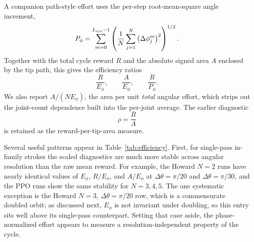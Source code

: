 \documentclass[11pt]{article}
\begin{document}
A companion path-style effort uses the per-step root-mean-square angle increment,
\begin{equation}
P_\phi
= \sum_{m=0}^{L_{\rm cyc}-1}
\left(
\frac{1}{N}
\sum_{j=1}^N
\left(\Delta \phi_j^m\right)^2
\right)^{1/2} .
\end{equation}
Together with the total cycle reward $R$ and the absolute signed area $A$ enclosed by the tip path, this gives the efficiency ratios
\begin{equation}
\frac{R}{E_\phi},
\qquad
\frac{A}{E_\phi},
\qquad
\frac{R}{P_\phi}.
\end{equation}
We also report $A/(N E_\phi)$, the area per unit \emph{total} angular effort, which strips out the joint-count dependence built into the per-joint average.
The earlier diagnostic
\begin{equation}
\rho = \frac{R}{A}
\end{equation}
is retained as the reward-per-tip-area measure.

Several useful patterns appear in Table~\ref{tab:efficiency}. First, for single-pass in-family strokes the scaled diagnostics are much more stable across angular resolution than the raw mean reward. For example, the Howard $N=2$ runs have nearly identical values of $E_\phi$, $R/E_\phi$, and $A/E_\phi$ at $\Delta\theta=\pi/20$ and $\Delta\theta=\pi/30$, and the PPO runs show the same stability for $N=3,4,5$. The one systematic exception is the Howard $N=3$, $\Delta\theta=\pi/20$ row, which is a commensurate doubled orbit; as discussed next, $E_\phi$ is not invariant under doubling, so this entry sits well above its single-pass counterpart. Setting that case aside, the phase-normalized effort appears to measure a resolution-independent property of the cycle.
\end{document}
